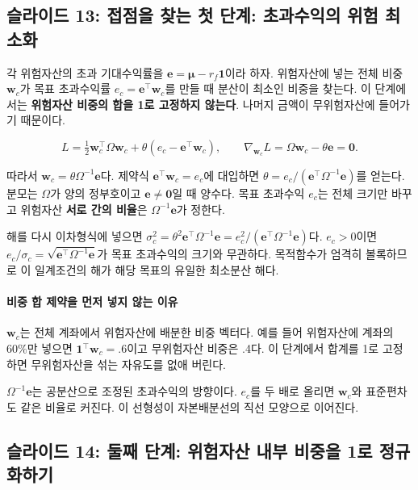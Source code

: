 \documentclass[11pt,a4paper]{article}
\begin{document}
\subsection{슬라이드 13: 접점을 찾는 첫 단계: 초과수익의 위험 최소화}

각 위험자산의 초과 기대수익률을 $\mathbf e=\boldsymbol\mu-r_f\mathbf1$이라 하자. 위험자산에 넣는 전체 비중 $\mathbf w_c$가 목표 초과수익률 $e_c=\mathbf e^\top\mathbf w_c$를 만들 때 분산이 최소인 비중을 찾는다. 이 단계에서는 \textbf{위험자산 비중의 합을 1로 고정하지 않는다}. 나머지 금액이 무위험자산에 들어가기 때문이다.
\par

\[
L=\tfrac12\mathbf w_c^\top\Omega\mathbf w_c
+\theta(e_c-\mathbf e^\top\mathbf w_c),
\qquad \nabla_{\mathbf w_c}L=\Omega\mathbf w_c-\theta\mathbf e=\mathbf0.
\]

따라서 $\mathbf w_c=\theta\Omega^{-1}\mathbf e$다. 제약식 $\mathbf e^\top\mathbf w_c=e_c$에 대입하면 $\theta=e_c/(\mathbf e^\top\Omega^{-1}\mathbf e)$를 얻는다. 분모는 $\Omega$가 양의 정부호이고 $\mathbf e\ne\mathbf0$일 때 양수다. 목표 초과수익 $e_c$는 전체 크기만 바꾸고 위험자산 \textbf{서로 간의 비율}은 $\Omega^{-1}\mathbf e$가 정한다.
\par

해를 다시 이차형식에 넣으면 $\sigma_c^2=\theta^2\mathbf e^\top\Omega^{-1}\mathbf e=e_c^2/(\mathbf e^\top\Omega^{-1}\mathbf e)$다. $e_c>0$이면 $e_c/\sigma_c=\sqrt{\mathbf e^\top\Omega^{-1}\mathbf e}$가 목표 초과수익의 크기와 무관하다. 목적함수가 엄격히 볼록하므로 이 일계조건의 해가 해당 목표의 유일한 최소분산 해다.
\par

\paragraph{비중 합 제약을 먼저 넣지 않는 이유}

$\mathbf w_c$는 전체 계좌에서 위험자산에 배분한 비중 벡터다. 예를 들어 위험자산에 계좌의 60\%만 넣으면 $\mathbf1^\top\mathbf w_c=.6$이고 무위험자산 비중은 .4다. 이 단계에서 합계를 1로 고정하면 무위험자산을 섞는 자유도를 없애 버린다.
\par

$\Omega^{-1}\mathbf e$는 공분산으로 조정된 초과수익의 방향이다. $e_c$를 두 배로 올리면 $\mathbf w_c$와 표준편차도 같은 비율로 커진다. 이 선형성이 자본배분선의 직선 모양으로 이어진다.
\par

\subsection{슬라이드 14: 둘째 단계: 위험자산 내부 비중을 1로 정규화하기}
\end{document}
